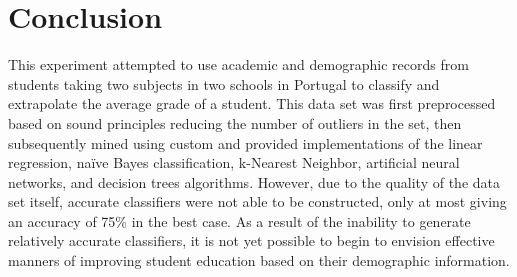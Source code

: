 \section{Conclusion}
This experiment attempted to use academic and demographic records from students taking two subjects in two schools in Portugal to classify and extrapolate the average grade of a student. This data set was first preprocessed based on sound principles reducing the number of outliers in the set, then subsequently mined using custom and provided implementations of the linear regression, naïve Bayes classification, k-Nearest Neighbor, artificial neural networks, and decision trees algorithms. However, due to the quality of the data set itself, accurate classifiers were not able to be constructed, only at most giving an accuracy of 75\% in the best case. As a result of the inability to generate relatively accurate classifiers, it is not yet possible to begin to envision effective manners of improving student education based on their demographic information.